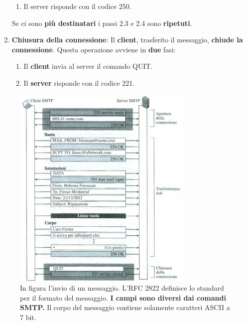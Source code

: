 \documentclass[11pt,a4paper,oneside]{book}
\theoremstyle{definition}
\begin{document}
\begin{enumerate}
\begin{enumerate}[label*=\arabic*.]
		      \item Il server risponde con il codice 250.
	      \end{enumerate}
	      Se ci sono \textbf{più destinatari} i passi 2.3 e 2.4 sono \textbf{ripetuti}.
	\item \textbf{Chiusura della connessione}: Il \textbf{client}, trasferito il messaggio, \textbf{chiude la connessione}. Questa operazione avviene in \textbf{due} fasi:
	      \begin{enumerate}[label*=\arabic*]
		      \item Il \textbf{client} invia al server il comando QUIT.
		      \item Il \textbf{server} risponde con il codice 221.
	      \end{enumerate}
\end{enumerate}

\pagebreak

\begin{figure}[!h]
	\includegraphics[scale=0.8]{Immagini/SMTPes.png}
	\centering
	\caption{In figura l'invio di un messaggio. L'RFC 2822 definisce lo standard per il formato del messaggio. \textbf{I campi sono diversi dai comandi SMTP.} Il corpo del messaggio  contiene solamente caratteri ASCII a 7 bit.}
\end{figure}
\end{document}
